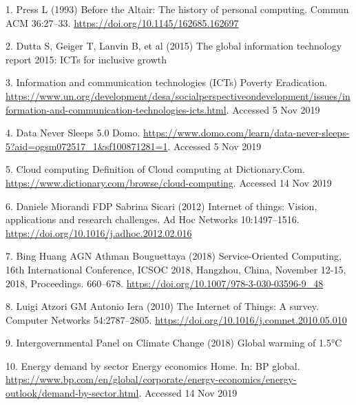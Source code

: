 \documentclass[11pt,]{article}
\begin{document}
\hypertarget{refs}{}
\leavevmode\hypertarget{ref-pressAltairHistoryPersonal1993}{}%
1. Press L (1993) Before the Altair: The history of personal computing.
Commun ACM 36:27--33. \url{https://doi.org/10.1145/162685.162697}

\leavevmode\hypertarget{ref-duttaGlobalInformationTechnology2015}{}%
2. Dutta S, Geiger T, Lanvin B, et al (2015) The global information
technology report 2015: ICTs for inclusive growth

\leavevmode\hypertarget{ref-InformationCommunicationTechnologies}{}%
3. Information and communication technologies (ICTs) \textbar{} Poverty
Eradication.
\url{https://www.un.org/development/desa/socialperspectiveondevelopment/issues/information-and-communication-technologies-icts.html}.
Accessed 5 Nov 2019

\leavevmode\hypertarget{ref-DataNeverSleeps}{}%
4. Data Never Sleeps 5.0 \textbar{} Domo.
\url{https://www.domo.com/learn/data-never-sleeps-5?aid=ogsm072517_1\&sf100871281=1}.
Accessed 5 Nov 2019

\leavevmode\hypertarget{ref-CloudComputingDefinition}{}%
5. Cloud computing \textbar{} Definition of Cloud computing at
Dictionary.Com. \url{https://www.dictionary.com/browse/cloud-computing}.
Accessed 14 Nov 2019

\leavevmode\hypertarget{ref-danielemiorandiInternetThingsVision2012}{}%
6. Daniele Miorandi FDP Sabrina Sicari (2012) Internet of things:
Vision, applications and research challenges. Ad Hoc Networks
10:1497--1516. \url{https://doi.org/10.1016/j.adhoc.2012.02.016}

\leavevmode\hypertarget{ref-binghuangServiceOrientedComputing16th2018}{}%
7. Bing Huang AGN Athman Bouguettaya (2018) Service-Oriented Computing,
16th International Conference, ICSOC 2018, Hangzhou, China, November
12-15, 2018, Proceedings. 660--678.
\url{https://doi.org/10.1007/978-3-030-03596-9_48}

\leavevmode\hypertarget{ref-luigiatzoriInternetThingsSurvey2010}{}%
8. Luigi Atzori GM Antonio Iera (2010) The Internet of Things: A survey.
Computer Networks 54:2787--2805.
\url{https://doi.org/10.1016/j.comnet.2010.05.010}

\leavevmode\hypertarget{ref-intergovernmentalpanelonclimatechangeGlobalWarming2018}{}%
9. Intergovernmental Panel on Climate Change (2018) Global warming of
1.5°C

\leavevmode\hypertarget{ref-EnergyDemandSector}{}%
10. Energy demand by sector \textbar{} Energy economics \textbar{} Home.
In: BP global.
\url{https://www.bp.com/en/global/corporate/energy-economics/energy-outlook/demand-by-sector.html}.
Accessed 14 Nov 2019
\end{document}
